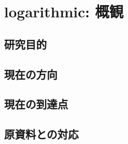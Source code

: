 
\section{logarithmic: 概観}

\subsection{研究目的}

\subsection{現在の方向}

\subsection{現在の到達点}

\subsection{原資料との対応}
